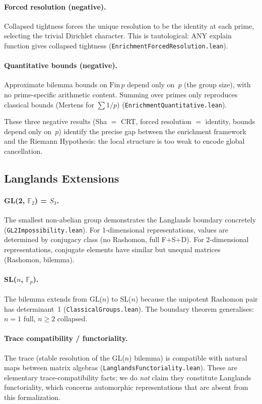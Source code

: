 \documentclass[11pt,a4paper]{article}
\begin{document}
\paragraph{Forced resolution (negative).}
Collapsed tightness forces the unique resolution to be the identity at each prime, selecting the trivial Dirichlet character.  This is tautological: ANY explain function gives collapsed tightness (\texttt{EnrichmentForcedResolution.lean}).

\paragraph{Quantitative bounds (negative).}
Approximate bilemma bounds on $\mathrm{Fin}\,p$ depend only on~$p$ (the group size), with no prime-specific arithmetic content.  Summing over primes only reproduces classical bounds (Mertens for $\sum 1/p$) (\texttt{EnrichmentQuantitative.lean}).

These three negative results (Sha $=$ CRT, forced resolution $=$ identity, bounds depend only on~$p$) identify the precise gap between the enrichment framework and the Riemann Hypothesis: the local structure is too weak to encode global cancellation.

\subsection{Langlands Extensions}

\paragraph{GL(2, $\mathbb{F}_2$) = $S_3$.}
The smallest non-abelian group demonstrates the Langlands boundary concretely (\texttt{GL2Impossibility.lean}).  For 1-dimensional representations, values are determined by conjugacy class (no Rashomon, full F+S+D).  For 2-dimensional representations, conjugate elements have similar but unequal matrices (Rashomon, bilemma).

\paragraph{SL($n$, $\mathbb{F}_p$).}
The bilemma extends from GL($n$) to SL($n$) because the unipotent Rashomon pair has determinant~1 (\texttt{ClassicalGroups.lean}).  The boundary theorem generalises: $n = 1$ full, $n \geq 2$ collapsed.

\paragraph{Trace compatibility / functoriality.}
The trace (stable resolution of the GL($n$) bilemma) is compatible with natural maps between matrix algebras (\texttt{LanglandsFunctoriality.lean}).  These are elementary trace-compatibility facts; we do \emph{not} claim they constitute Langlands functoriality, which concerns automorphic representations that are absent from this formalization.
\end{document}
